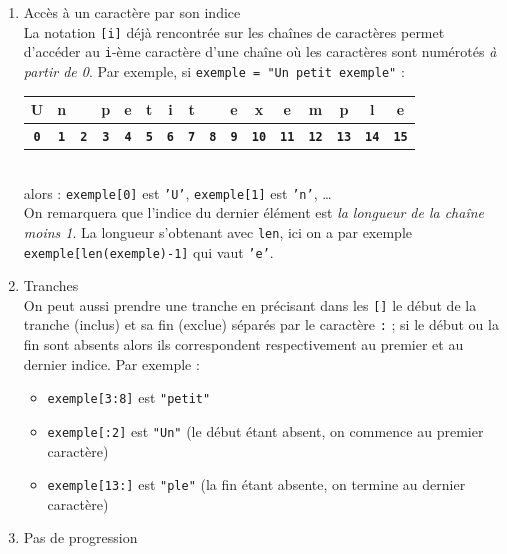 \documentclass[11pt,a4paper]{article}
\begin{document}
\begin{tcolorbox}[left=0cm,title=\bf{\faPython \; Tranches},colbacktitle=cfond]
	\begin{enumerate}
	 \item[\ding{182}] Accès à un caractère par son indice \\
	 La notation {\tt [i]} déjà rencontrée sur les chaînes de caractères permet d'accéder au {\tt i}-ème caractère d'une chaîne où les caractères sont numérotés \textit{à partir de 0}. Par exemple,
	 si \texttt{exemple = "Un petit exemple"} : \\
	 \newcommand{\ind}[1]{\multicolumn{1}{c}{\textbf{\tt \footnotesize #1}}}
	 \begin{tabular}{|c|c|c|c|c|c|c|c|c|c|c|c|c|c|c|c|}
		\hline
		U & n & & p & e & t & i & t&  & e & x & e & m & p & l & e \\
		\hline
		\ind{0} & \ind{1}& \ind{2}& \ind{3}& \ind{4}& \ind{5}& \ind{6}& \ind{7}& \ind{8}& \ind{9}& \ind{10}& \ind{11}& \ind{12}& \ind{13}& \ind{14} & \ind{15}
	 \end{tabular}\\
	 alors : \texttt{exemple[0]} est {\tt 'U'}, \texttt{exemple[1]} est {\tt 'n'}, \dots \\
	 {\small \important} \; On remarquera que l'indice du dernier élément est \textit{la longueur de la chaîne moins 1}. La longueur s'obtenant avec {\tt len}, ici on a par exemple \texttt{exemple[len(exemple)-1]} qui vaut {\tt 'e'}.
	 \item[\ding{183}] Tranches \\
	 On peut aussi prendre une tranche en précisant dans les {\tt []} le début de la tranche (inclus) et sa fin (exclue) séparés par le caractère {\tt :} ; si le début ou la fin sont absents alors ils correspondent respectivement au premier et au dernier indice. Par exemple :
	 \begin{itemize}
	  \item[\textbullet] \texttt{exemple[3:8]} est {\tt "petit"}
	  \item[\textbullet] \texttt{exemple[:2]} est {\tt "Un"} (le début étant absent, on commence au premier caractère)
	  \item[\textbullet] \texttt{exemple[13:]} est {\tt "ple"} (la fin étant absente, on termine au dernier caractère)
	 \end{itemize}	
	\item[\ding{184}] Pas de progression \\

\end{enumerate}
\end{tcolorbox}
\end{document}
